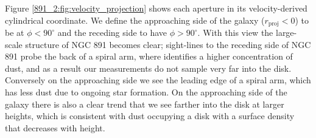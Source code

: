 




Figure \ref{891_2:fig:velocity_projection} shows each aperture in its
velocity-derived cylindrical coordinate. We define the approaching
side of the galaxy ($r_\mathrm{proj} < 0$) to be at $\phi <
90^{\circ}$ and the receding side to have $\phi > 90^{\circ}$. With
this view the large-scale structure of NGC 891 becomes clear;
sight-lines to the receding side of NGC 891 probe the back of a spiral
arm, where \citet{Kamphuis07b} identifies a higher concentration of
dust, and as a result our measurements do not sample very far into the
disk. Conversely on the approaching side we see the leading edge of a
spiral arm, which has less dust due to ongoing star formation. On the
approaching side of the galaxy there is also a clear trend that we see
farther into the disk at larger heights, which is consistent with dust
occupying a disk with a surface density that decreases with height.

